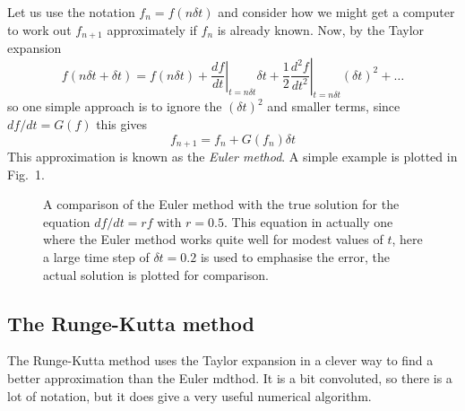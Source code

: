 \documentclass[12pt]{article}
\begin{document}
Let us use the notation $f_n=f(n\delta t)$ and consider how we might
get a computer to work out $f_{n+1}$ approximately if $f_n$ is already
known. Now, by the Taylor expansion
\begin{equation}
f(n\delta t+\delta t)=f(n\delta
t)+\left.\frac{df}{dt}\right|_{t=n\delta t}\delta
t+\frac{1}{2}\left.\frac{d^2f}{dt^2}\right|_{t=n\delta t}(\delta t)^2+\ldots
\end{equation}
so one simple approach is to ignore the $(\delta t)^2$ and smaller terms, since $df/dt=G(f)$ this gives
\begin{equation}
f_{n+1}=f_n+G(f_n)\delta t
\end{equation}
This approximation is known as the \textsl{Euler method}. A simple example is plotted in Fig.~1.

\begin{figure}
\begin{center}

\end{center}
\caption{A comparison of the Euler method with the true solution for
  the equation $df/dt=rf$ with $r=0.5$. This equation in actually one where
  the Euler method works quite well for modest values of $t$, here a
  large time step of $\delta t=0.2$ is used to emphasise the error,
  the actual solution is plotted for
  comparison.}
\end{figure}

\subsection*{The Runge-Kutta method}

The Runge-Kutta method uses the Taylor expansion in a clever way to
find a better approximation than the Euler mdthod. It is a bit
convoluted, so there is a lot of notation, but it does give a very
useful numerical algorithm.
\end{document}
